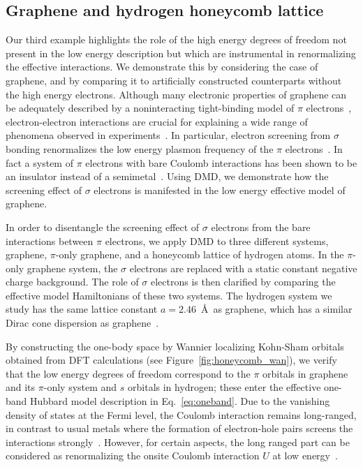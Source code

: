 \subsection{Graphene and hydrogen honeycomb lattice}
\label{subsection:graphene}
Our third example highlights the role of the high energy 
degrees of freedom not present in the low energy description 
but which are instrumental in renormalizing the effective interactions. 
We demonstrate this by considering the case of graphene, and by 
comparing it to artificially constructed counterparts without the high energy electrons. 
Although many electronic properties of graphene can be adequately 
described by a noninteracting tight-binding model of $\pi$ electrons~\cite{Castro2009}, 
electron-electron interactions are crucial for explaining 
a wide range of phenomena observed in experiments~\cite{Kotov2012}. 
In particular, electron screening from $\sigma$ bonding renormalizes 
the low energy plasmon frequency of the $\pi$ electrons~\cite{Zheng2016}. 
In fact a system of $\pi$ electrons with bare Coulomb interactions has been shown to be an insulator instead of a semimetal~\cite{DrutPRL2009, DrutPRB2009,  Smith2014, Zheng2016}. 
Using DMD, we demonstrate how the screening effect of $\sigma$ electrons is manifested in the low energy effective model of graphene. 

In order to disentangle the screening effect of $\sigma$ electrons from the bare interactions 
between $\pi$ electrons, we apply DMD to three different systems, graphene, $\pi$-only graphene, and a honeycomb lattice of hydrogen atoms.  
In the $\pi$-only graphene system, the 
$\sigma$ electrons are replaced with a static constant negative charge background. 
The role of $\sigma$ electrons is then clarified by comparing the effective model Hamiltonians of these two systems. 
The hydrogen system we study has the same lattice constant $a=2.46$~\AA~as graphene, 
which has a similar Dirac cone dispersion as graphene~\cite{Zheng2016}. 

By constructing the one-body space by Wannier localizing Kohn-Sham orbitals obtained from DFT calculations (see Figure~\ref{fig:honeycomb_wan}), 
we verify that the low energy degrees of freedom correspond to the $\pi$ orbitals in graphene and 
its $\pi$-only system and $s$ orbitals in hydrogen; these enter the effective one-band Hubbard model description in Eq.~\eqref{eq:oneband}. 
Due to the vanishing density of states at the Fermi level, the Coulomb interaction remains long-ranged, 
in contrast to usual metals where the formation of electron-hole pairs screens the interactions strongly~\cite{Zheng2016}. 
However, for certain aspects, the long ranged part can be considered as renormalizing the 
onsite Coulomb interaction $U$ at low energy~\cite{Schuler2013, Changlani2015}. 

